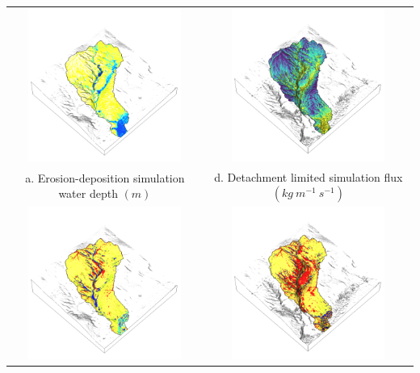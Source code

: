 \documentclass{standalone}
\begin{document}
\scriptsize
\centering 


\begin{tabular}{m{} m{}}
% 
\multicolumn{1}{c}{\includegraphics[height=50mm]{../../images/ss_erdep_3d/depth.png}} %
& \multicolumn{1}{c}{\includegraphics[height=50mm]{../../images/ss_flux_3d/flux.png}}\\
\multicolumn{1}{c}{a. Erosion-deposition simulation water depth $(m)$} 
& \multicolumn{1}{c}{d. Detachment limited simulation flux $(kg~m^{-1}~s^{-1})$}\\
%
\multicolumn{1}{c}{\includegraphics[height=50mm]{../../images/ss_erdep_3d/landforms.png}} &
\multicolumn{1}{c}{\includegraphics[height=50mm]{../../images/ss_flux_3d/landforms.png}}\\

\end{tabular}
\end{document}

